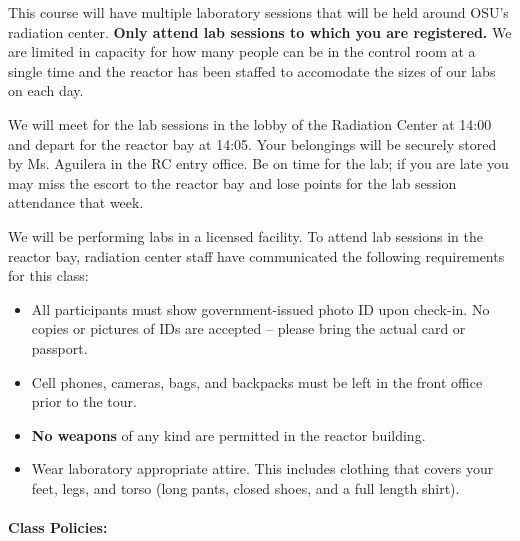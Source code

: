 \documentclass[11pt, a4paper]{article}
\begin{document}
This course will have multiple laboratory sessions that will be held
around OSU's radiation center. \textbf{Only attend lab sessions to which you are registered.} We are limited in capacity for how many people can be in the control room at a single time and the reactor has been staffed to accomodate the sizes of our labs on each day. 

We will meet for the lab sessions in the lobby of the Radiation Center at 14:00 and depart for the reactor bay at 14:05. Your belongings will be securely stored by Ms. Aguilera in the RC entry office. Be on time for the lab; if you are late you may miss the escort to the reactor bay and lose points for the lab session attendance that week. 

We will be performing labs in a licensed facility. To attend lab sessions in the reactor bay, radiation center staff have communicated the following requirements for this class:

\begin{itemize}
\item All participants must show government-issued photo ID upon check-in. No copies or pictures of IDs are accepted -- please bring the actual card or passport. 
\item Cell phones, cameras, bags, and backpacks must be left in the front office prior to the tour. 
\item \textbf{No weapons} of any kind are permitted in the reactor building. 
\item Wear laboratory appropriate attire. This includes clothing that covers your feet, legs, and torso (long pants, closed shoes, and a full length shirt). 
\end{itemize} 


\paragraph{Class Policies:}
\end{document}
